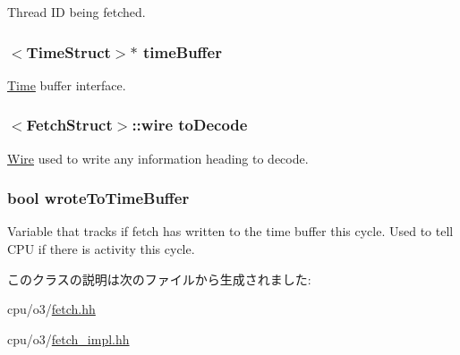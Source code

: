 Thread ID being fetched. \hypertarget{classDefaultFetch_a83f9ee976e732665aeb08dbc19acfd45}{
\subsubsection[{timeBuffer}]{$<${\bf TimeStruct}$>$$\ast$ {\bf timeBuffer}}}
\label{classDefaultFetch_a83f9ee976e732665aeb08dbc19acfd45}
\hyperlink{classTime}{Time} buffer interface. \hypertarget{classDefaultFetch_a5283adcc786817de9adc5a4601aa3a6f}{
\subsubsection[{toDecode}]{$<${\bf FetchStruct}$>$::wire {\bf toDecode}}}
\label{classDefaultFetch_a5283adcc786817de9adc5a4601aa3a6f}
\hyperlink{classWire}{Wire} used to write any information heading to decode. \hypertarget{classDefaultFetch_a2c7e870d4babdac0dc91fc7ffabd0f3d}{
\subsubsection[{wroteToTimeBuffer}]{\setlength{\rightskip}{0pt plus 5cm}bool {\bf wroteToTimeBuffer}}}
\label{classDefaultFetch_a2c7e870d4babdac0dc91fc7ffabd0f3d}
Variable that tracks if fetch has written to the time buffer this cycle. Used to tell CPU if there is activity this cycle. 

このクラスの説明は次のファイルから生成されました:\begin{DoxyCompactItemize}
\item 
cpu/o3/\hyperlink{fetch_8hh}{fetch.hh}\item 
cpu/o3/\hyperlink{fetch__impl_8hh}{fetch\_\-impl.hh}\end{DoxyCompactItemize}
